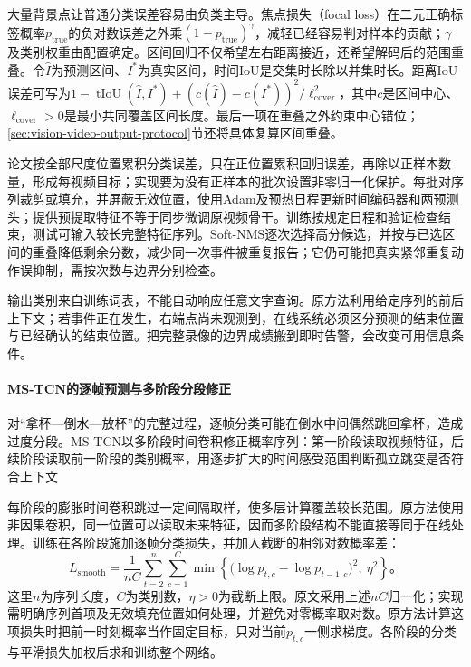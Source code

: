 大量背景点让普通分类误差容易由负类主导。焦点损失（focal loss）在二元正确标签概率$p_{\mathrm{true}}$的负对数误差之外乘$(1-p_{\mathrm{true}})^\gamma$，减轻已经容易判对样本的贡献；$\gamma$及类别权重由配置确定。区间回归不仅希望左右距离接近，还希望解码后的范围重叠。令$\widehat{I}$为预测区间、$I^*$为真实区间，时间IoU是交集时长除以并集时长。距离IoU误差可写为$1-\operatorname{tIoU}(\widehat{I},I^*)+(c(\widehat{I})-c(I^*))^2/\ell_{\mathrm{cover}}^2$，其中$c$是区间中心、$\ell_{\mathrm{cover}}>0$是最小共同覆盖区间长度。最后一项在重叠之外约束中心错位；\ref{sec:vision-video-output-protocol}节还将具体复算区间重叠。

论文按全部尺度位置累积分类误差，只在正位置累积回归误差，再除以正样本数量，形成每视频目标；实现要为没有正样本的批次设置非零归一化保护。每批对序列裁剪或填充，并屏蔽无效位置，使用Adam及预热日程更新时间编码器和两预测头；提供预提取特征不等于同步微调原视频骨干。训练按规定日程和验证检查结束，测试可输入较长完整特征序列。Soft-NMS逐次选择高分候选，并按与已选区间的重叠降低剩余分数，减少同一次事件被重复报告；它仍可能把真实紧邻重复动作误抑制，需按次数与边界分别检查。

输出类别来自训练词表，不能自动响应任意文字查询。原方法利用给定序列的前后上下文；若事件正在发生，右端点尚未观测到，在线系统必须区分预测的结束位置与已经确认的结束位置。把完整录像的边界成绩搬到即时告警，会改变可用信息条件。

\paragraph{MS-TCN的逐帧预测与多阶段分段修正}
\label{sec:vision-video-mstcn}

对“拿杯—倒水—放杯”的完整过程，逐帧分类可能在倒水中间偶然跳回拿杯，造成过度分段。MS-TCN以多阶段时间卷积修正概率序列：第一阶段读取视频特征，后续阶段读取前一阶段的类别概率，用逐步扩大的时间感受范围判断孤立跳变是否符合上下文

每阶段的膨胀时间卷积跳过一定间隔取样，使多层计算覆盖较长范围。原方法使用非因果卷积，同一位置可以读取未来特征，因而多阶段结构不能直接等同于在线处理。训练在各阶段施加逐帧分类损失，并加入截断的相邻对数概率差：
\begin{equation}
  L_{\mathrm{smooth}}
  =\frac{1}{nC}\sum_{t=2}^{n}\sum_{c=1}^{C}
  \min\!\left\{
  \bigl(\log p_{t,c}-\log p_{t-1,c}\bigr)^2,\ \eta^2
  \right\}\text{。}
  \label{eq:vision-video-smoothing}
\end{equation}
这里$n$为序列长度，$C$为类别数，$\eta>0$为截断上限。原文采用上述$nC$归一化；实现需明确序列首项及无效填充位置如何处理，并避免对零概率取对数。原方法计算这项损失时把前一时刻概率当作固定目标，只对当前$p_{t,c}$一侧求梯度。各阶段的分类与平滑损失加权后求和训练整个网络。

